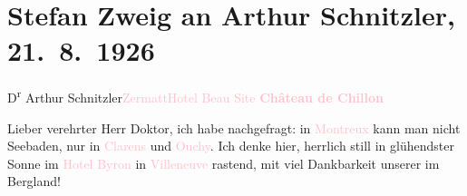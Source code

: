 

\renewcommand{\erwaehntePersonen}{Personen: Clara Katharina Pollaczek, Stefan Zweig}
\renewcommand{\erwaehnteOrte}{Orte: Clarens, Hôtel Byron, Montreux, Ouchy, Parkhotel Beau Site, Schloss Chillon, Villeneuve, Zermatt}
\renewcommand{\erwaehnteWerke}{}
\section[Stefan Zweig an Arthur Schnitzler, 21. 8. 1926]{Stefan Zweig an Arthur Schnitzler, 21. 8. 1926}
\nopagebreak{}
\rehead{ }\normalsize\beginnumbering{}
\toendnotes[C]{\smallbreak\pagebreak[2]}
\toendnotes[C]{\smallbreak}\pstart{}{\pb}D\textsuperscript{r}
                  Arthur Schnitzler\pend{}\pstart{}\textcolor{pink}{Zermatt}{}\ledrightnote{\textcolor{pink}{Zermatt}}\pend{}\pstart{}\textcolor{pink}{Hotel Beau Site}{}\ledrightnote{\textcolor{pink}{Parkhotel Beau Site}}\pend{}
{\bigskip}
\pstart
           \noindent{}\centering{}{\pb}\textcolor{gray}{\textbf{\textcolor{pink}{Château de Chillon}{}\ledrightnote{\textcolor{pink}{Schloss Chillon}}}}\pend
           
\pstart
           \noindent{}{\pb}Lieber verehrter Herr
                  Doktor, ich habe nachgefragt: in \textcolor{pink}{Montreux}{}\ledrightnote{\textcolor{pink}{Montreux}} kann man nicht Seebaden, nur in \textcolor{pink}{Clarens}{}\ledrightnote{\textcolor{pink}{Clarens}} und \textcolor{pink}{Ouchy}{}\ledrightnote{\textcolor{pink}{Ouchy}}. Ich denke hier,
               herrlich still in glühendster Sonne im \textcolor{pink}{Hotel
                  Byron}{}\ledrightnote{\textcolor{pink}{Hôtel Byron}} in \textcolor{pink}{Villeneuve}{}\ledrightnote{\textcolor{pink}{Villeneuve}} rastend, mit viel
               Dankbarkeit unserer \label{K_L03671-1v}\label{K_L03671-1h} im Bergland!\pend
           
